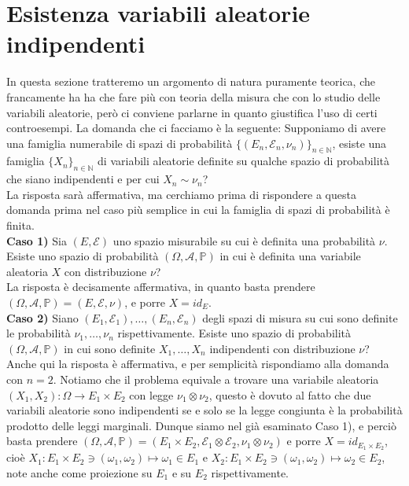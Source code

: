\documentclass[11pt]{book}
\theoremstyle{Definizione}
\theoremstyle{TeoremaProposizioneLemmaCorollario}
\theoremstyle{OsservazioneNota}
\newcommand{\N}{\mathbb{N}}
\newcommand{\id}[1]{id_{{#1}}}
\renewcommand{\P}{\mathbb{P}}
\begin{document}
\section{Esistenza variabili aleatorie indipendenti}
In questa sezione tratteremo un argomento di natura puramente teorica, che francamente ha ha che fare più con teoria della misura che con lo studio delle variabili aleatorie, però ci conviene parlarne in quanto giustifica l'uso di certi controesempi. La domanda che ci facciamo è la seguente: Supponiamo di avere una famiglia numerabile di spazi di probabilità $\{(E_n,\mathcal{E}_n,\nu_n)\}_{n\in \N}$, esiste una famiglia $\{X_n\}_{n\in \N}$ di variabili aleatorie definite su qualche spazio di probabilità che siano indipendenti e per cui $X_n \sim \nu_n$?\\
La risposta sarà affermativa, ma cerchiamo prima di rispondere a questa domanda prima nel caso più semplice in cui la famiglia di spazi di probabilità è finita.\\
\textbf{Caso 1)} Sia $(E,\mathcal{E})$ uno spazio misurabile su cui è definita una probabilità $\nu$. Esiste uno spazio di probabilità $(\Omega,\mathcal{A},\P)$ in cui è definita una variabile aleatoria $X$ con distribuzione $\nu$?\\
La risposta è decisamente affermativa, in quanto basta prendere $(\Omega,\mathcal{A},\P) = (E,\mathcal{E},\nu)$, e porre $X = \id{E}$.\\
\textbf{Caso 2)} Siano $(E_1,\mathcal{E}_1),\dots,(E_n,\mathcal{E}_n)$ degli spazi di misura su cui sono definite le probabilità $\nu_1,\dots,\nu_n$ rispettivamente. Esiste uno spazio di probabilità $(\Omega,\mathcal{A},\P)$ in cui sono definite $X_1,\dots, X_n$ indipendenti con distribuzione $\nu$?\\
Anche qui la risposta è affermativa, e per semplicità rispondiamo alla domanda con $n = 2$. Notiamo che il problema equivale a trovare una variabile aleatoria $(X_1,X_2) :\Omega \longrightarrow E_1\times E_2$ con legge $\nu_1\otimes \nu_2$, questo è dovuto al fatto che due variabili aleatorie sono indipendenti se e solo se la legge congiunta è la probabilità prodotto delle leggi marginali. Dunque siamo nel già esaminato Caso 1), e perciò basta prendere $(\Omega,\mathcal{A},\P) = (E_1\times E_2,\mathcal{E}_1\otimes \mathcal{E}_2,\nu_1\otimes\nu_2)$ e porre $X = \id{E_1\times E_2}$, cioè $X_1:E_1\times E_2 \ni (\omega_1,\omega_2)\longmapsto \omega_1\in E_1$ e $X_2 :E_1\times E_2 \ni (\omega_1,\omega_2)\longmapsto \omega_2\in E_2$, note anche come proiezione su $E_1$ e su $E_2$ rispettivamente.\\
\end{document}
